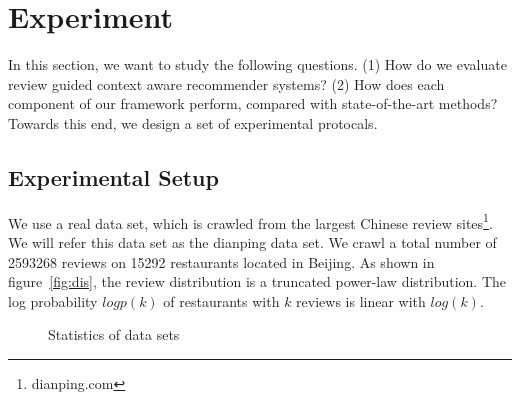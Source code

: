 \documentclass[preprint,12pt]{elsarticle}
\begin{document}
\section{Experiment}\label{sec:exp}
In this section, we want to study the following questions. (1) How do we evaluate review guided context aware recommender systems? (2) How does each component of our framework perform, compared with state-of-the-art methods? Towards this end, we design a set of experimental protocals. 

\subsection{Experimental Setup}
We use a  real data set, which is crawled from the largest Chinese review sites\footnote{dianping.com}. We will refer this data set as the dianping data set. We crawl a total number of 2593268 reviews on 15292 restaurants located in Beijing. As shown in figure~\ref{fig:dis}, the review distribution is a truncated power-law distribution. The log probability $logp(k)$ of restaurants with $k$ reviews is linear with $log(k)$. 

\begin{figure}
\caption{Statistics of data sets}
\end{figure}
\end{document}
